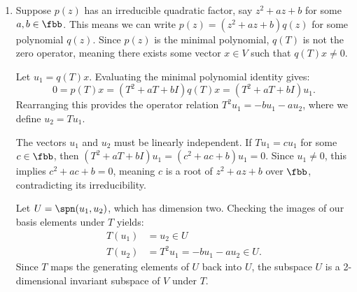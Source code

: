 \begin{sol}
\begin{enumerate}
\begin{itemize}
            To confirm linear independence, suppose $u = \alpha w$ for some $\alpha \in \fbb$.
            Then $(T - \lambda I)w = \alpha w$, so $w$ is an eigenvector of $T$ with eigenvalue $\lambda + \alpha$.
            But then $(T - \lambda I)^2 w = \alpha^2 w$. Since $(T - \lambda I)^2 w = 0$ and $w \neq 0$, this forces $\alpha = 0$, contradicting our deduction that $\alpha \neq 0$ (since $u \neq 0$).
            Therefore, $u$ and $w$ are linearly independent, and $\spn(u, w)$ is a 2-dimensional invariant subspace of $V$ under $T$.
            \item Distinct linear factor: $p(z) = (z - \lambda)(z - \mu)g(z)$ with $\lambda \neq \mu$.
            Then $T$ has two distinct eigenvalues, yielding two linearly independent eigenvectors $v$ and $u$.
            The subspace $\spn(v, u)$ is 2-dimensional, and since $Tv = \lambda v \in \spn(v, u)$ and $Tu = \mu u \in \spn(v, u)$, it is explicitly invariant.
        \end{itemize}

        \item Suppose $p(z)$ has an irreducible quadratic factor, say $z^2 + az + b$ for some $a, b \in \fbb$.
        This means we can write $p(z) = (z^2 + az + b)q(z)$ for some polynomial $q(z)$.
        Since $p(z)$ is the minimal polynomial, $q(T)$ is not the zero operator, meaning there exists some vector $x \in V$ such that $q(T)x \neq 0$.
        
        Let $u_1 = q(T)x$.
        Evaluating the minimal polynomial identity gives:
        \[
        	0 = p(T)x = (T^2 + aT + bI)q(T)x = (T^2 + aT + bI)u_1.
        \]
        Rearranging this provides the operator relation $T^2 u_1 = -b u_1 - a u_2$, where we define $u_2 = Tu_1$.
        
        The vectors $u_1$ and $u_2$ must be linearly independent.
        If $Tu_1 = cu_1$ for some $c \in \fbb$, then $(T^2 + aT + bI)u_1 = (c^2 + ac + b)u_1 = 0$.
        Since $u_1 \neq 0$, this implies $c^2 + ac + b = 0$, meaning $c$ is a root of $z^2 + az + b$ over $\fbb$, contradicting its irreducibility.
        
        Let $U = \spn(u_1, u_2)$, which has dimension two.
        Checking the images of our basis elements under $T$ yields:
        \begin{align*}
            T(u_1) &= u_2 \in U \\
            T(u_2) &= T^2 u_1 = -b u_1 - a u_2 \in U.
        \end{align*}
        Since $T$ maps the generating elements of $U$ back into $U$, the subspace $U$ is a 2-dimensional invariant subspace of $V$ under $T$.
    \end{enumerate}
\end{sol}
